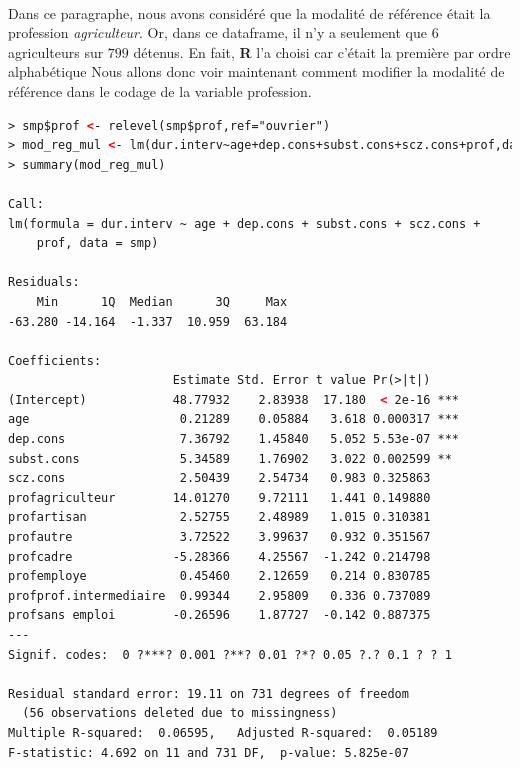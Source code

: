 \\
Dans ce paragraphe, nous avons considéré que la modalité de référence était la profession \textit{agriculteur}. Or, dans ce dataframe, il n'y a seulement que $6$ agriculteurs sur $799$ détenus. En fait, \textbf{R} l'a choisi car c'était la première par ordre alphabétique\newline
Nous allons donc voir maintenant comment modifier la modalité de référence dans le codage de la variable profession.\newline
\\
\begin{lstlisting}[language=html]
> smp$prof <- relevel(smp$prof,ref="ouvrier")
> mod_reg_mul <- lm(dur.interv~age+dep.cons+subst.cons+scz.cons+prof,data = smp)
> summary(mod_reg_mul)

Call:
lm(formula = dur.interv ~ age + dep.cons + subst.cons + scz.cons + 
    prof, data = smp)

Residuals:
    Min      1Q  Median      3Q     Max 
-63.280 -14.164  -1.337  10.959  63.184 

Coefficients:
                       Estimate Std. Error t value Pr(>|t|)    
(Intercept)            48.77932    2.83938  17.180  < 2e-16 ***
age                     0.21289    0.05884   3.618 0.000317 ***
dep.cons                7.36792    1.45840   5.052 5.53e-07 ***
subst.cons              5.34589    1.76902   3.022 0.002599 ** 
scz.cons                2.50439    2.54734   0.983 0.325863    
profagriculteur        14.01270    9.72111   1.441 0.149880    
profartisan             2.52755    2.48989   1.015 0.310381    
profautre               3.72522    3.99637   0.932 0.351567    
profcadre              -5.28366    4.25567  -1.242 0.214798    
profemploye             0.45460    2.12659   0.214 0.830785    
profprof.intermediaire  0.99344    2.95809   0.336 0.737089    
profsans emploi        -0.26596    1.87727  -0.142 0.887375    
---
Signif. codes:  0 ?***? 0.001 ?**? 0.01 ?*? 0.05 ?.? 0.1 ? ? 1

Residual standard error: 19.11 on 731 degrees of freedom
  (56 observations deleted due to missingness)
Multiple R-squared:  0.06595,	Adjusted R-squared:  0.05189 
F-statistic: 4.692 on 11 and 731 DF,  p-value: 5.825e-07
\end{lstlisting}

